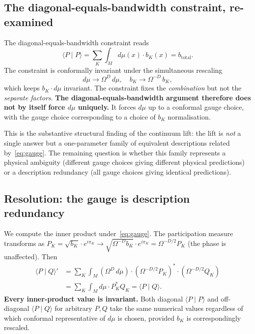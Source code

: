 \documentclass[11pt,a4paper]{article}
\begin{document}
\subsection{The diagonal-equals-bandwidth constraint, re-examined}

The diagonal-equals-bandwidth constraint reads
\begin{equation}
\langle P \mid P \rangle = \sum_K \int_M d\mu(x) \cdot b_K(x) = b_\mathrm{total}.
\label{eq:contdiag}
\end{equation}
The constraint is conformally invariant under the simultaneous rescaling
\begin{equation}
d\mu \to \Omega^D \, d\mu, \quad b_K \to \Omega^{-D} \, b_K,
\label{eq:gauge}
\end{equation}
which keeps $b_K \cdot d\mu$ invariant. The constraint fixes the \emph{combination} but not the \emph{separate factors}. \textbf{The diagonal-equals-bandwidth argument therefore does not by itself force $d\mu$ uniquely.} It forces $d\mu$ up to a conformal gauge choice, with the gauge choice corresponding to a choice of $b_K$ normalisation.

This is the substantive structural finding of the continuum lift: the lift is \emph{not} a single answer but a one-parameter family of equivalent descriptions related by~\eqref{eq:gauge}. The remaining question is whether this family represents a physical ambiguity (different gauge choices giving different physical predictions) or a description redundancy (all gauge choices giving identical predictions).

\subsection{Resolution: the gauge is description redundancy}

We compute the inner product under~\eqref{eq:gauge}. The participation measure transforms as $P_K = \sqrt{b_K} \cdot e^{i \pi_K} \to \sqrt{\Omega^{-D} b_K} \cdot e^{i \pi_K} = \Omega^{-D/2} P_K$ (the phase is unaffected). Then
\begin{align}
\langle P \mid Q \rangle' &= \sum_K \int_M (\Omega^D \, d\mu) \cdot (\Omega^{-D/2} P_K)^* \cdot (\Omega^{-D/2} Q_K) \nonumber \\
&= \sum_K \int_M d\mu \cdot P_K^* Q_K = \langle P \mid Q \rangle.
\label{eq:gaugeinvariance}
\end{align}
\textbf{Every inner-product value is invariant.} Both diagonal $\langle P \mid P \rangle$ and off-diagonal $\langle P \mid Q \rangle$ for arbitrary $P, Q$ take the same numerical values regardless of which conformal representative of $d\mu$ is chosen, provided $b_K$ is correspondingly rescaled.
\end{document}
